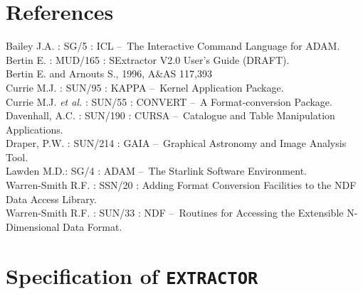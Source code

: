 \documentclass[twoside,11pt]{article}
\newcommand{\xref}[3]{#1}
\newcommand{\xlabel}[1]{}
\renewcommand{\_}{\texttt{\symbol{95}}}
\newcommand{\EXTRACTOR}{\texttt{EXTRACTOR}}
\newcommand{\dash}{--}
\newcommand{\dash}{-}
\begin{document}
\section{\xlabel{references}References}
Bailey J.A. : \xref{SG/5}{sg5}{} : ICL \dash\ The Interactive Command Language for ADAM.\\
Bertin E. : MUD/165 : SExtractor V2.0 User's Guide (DRAFT).\\
Bertin E. and Arnouts S., 1996, A\&AS 117,393\\
Currie M.J. : \xref{SUN/95}{sun95}{} : KAPPA \dash\ Kernel Application Package.\\
Currie M.J. \textit{et al.} : \xref{SUN/55}{sun55}{} : CONVERT \dash\ A Format-conversion Package.\\
Davenhall, A.C. : \xref{SUN/190}{sun190}{} : CURSA \dash\ Catalogue and Table Manipulation Applications.\\
Draper, P.W. : \xref{SUN/214}{sun214}{} : GAIA \dash\ Graphical Astronomy and Image Analysis Tool.\\
Lawden M.D.: \xref{SG/4}{sg4}{} : ADAM \dash\ The Starlink Software Environment.\\
Warren-Smith R.F. : \xref{SSN/20}{ssn20}{} : Adding Format Conversion Facilities to the NDF Data Access Library.\\
Warren-Smith R.F. : \xref{SUN/33}{sun33}{} : NDF \dash\ Routines for Accessing the Extensible N-Dimensional Data Format.\\

\newpage
\appendix
\section{\xlabel{specification_of_extractor}Specification of \EXTRACTOR}
\end{document}

